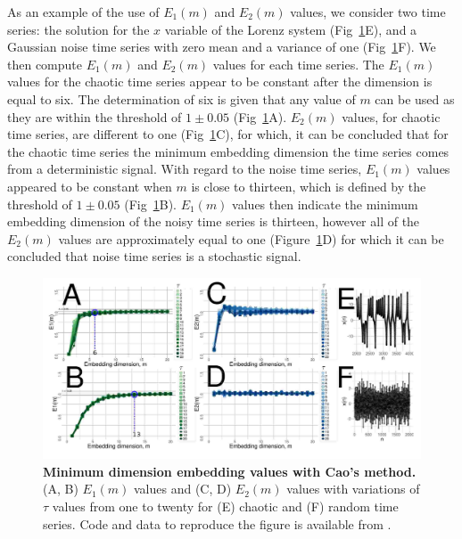 \documentclass[fleqn,10pt]{wlscirep}
\begin{document}
As an example of the use of $E_1(m)$ and $E_2(m)$ values, we consider two time 
series: the solution for the $x$ variable of the Lorenz system 
(Fig~\ref{fig:e1e2}E), and a Gaussian noise time series with zero mean 
and a variance of one (Fig~\ref{fig:e1e2}F).
We then compute $E_1(m)$ and $E_2(m)$ values for each time series.
The $E_1(m)$ values for the chaotic time series appear to be constant
after the dimension is equal to six.
The determination of six is given that any value of $m$ can be used as they 
are within the threshold of $1\pm0.05$ (Fig~\ref{fig:e1e2}A).
$E_2(m)$ values, for chaotic time series, are different to one 
(Fig~\ref{fig:e1e2}C), for which, it can be concluded that for the 
chaotic time series the minimum embedding dimension the time series 
comes from a deterministic signal. With regard to the noise time series,  
$E_1(m)$ values appeared to be constant when $m$ is close to thirteen, 
which is defined by the threshold of $1\pm0.05$ (Fig~\ref{fig:e1e2}B).
$E_1(m)$ values then indicate the minimum embedding dimension of the 
noisy time series is thirteen, however all of the $E_2(m)$ values are 
approximately equal to one (Figure~\ref{fig:e1e2}D) for which it can be 
concluded that noise time series is a stochastic signal.
\begin{figure}[ht]
\centering
\includegraphics[width=1.0\textwidth]{figures/methods/cao/pdf/cao}
    \caption{
	{\bf Minimum dimension embedding values with Cao's method.} 
	(A, B) $E_1 (m)$ values and (C, D) $E_2(m)$ values 
	with variations of $\tau$ values from one to twenty
	for (E) chaotic and (F) random time series.
	Code and data to reproduce the figure is available from \cite{srep2019}.
        }
    \label{fig:e1e2}
\end{figure}
\end{document}
